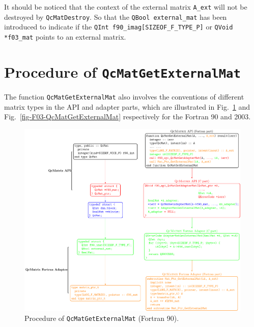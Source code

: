 \documentclass[a4paper,11pt,twoside,openright]{book}
\begin{document}
It should be noticed that the context of the external matrix \verb|A_ext| will not
be destroyed by \verb|QcMatDestroy|. So that the \verb|QBool external_mat| has been
introduced to indicate if the \linebreak\verb|QInt f90_imag[SIZEOF_F_TYPE_P]| or
\verb|QVoid *f03_mat| points to an external matrix.

\section{Procedure of \texttt{QcMatGetExternalMat}}
\label{section-procedure-QcMatGetExternalMat}

The function \verb|QcMatGetExternalMat| also involves the conventions of different
matrix types in the API and adapter parts, which are illustrated in Fig.~\ref{fig-F90-QcMatGetExternalMat}
and Fig.~\ref{fig-F03-QcMatGetExternalMat} respectively for the Fortran 90 and 2003.
\begin{figure}[hbtp]
  \centering
  \includegraphics[width=16cm]{F90_QcMatGetExternalMat.pdf}
  \caption{Procedure of \texttt{QcMatGetExternalMat} (Fortran 90).}
  \label{fig-F90-QcMatGetExternalMat}
\end{figure}
\end{document}
